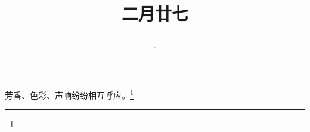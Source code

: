 \title{\date[d=5,m=4,y=2024][year:cn-y,年,month:cn,day:cn,日,·,weekday]·二月廿七 }
芳香、色彩、声响纷纷相互呼应。\footnote{ }

